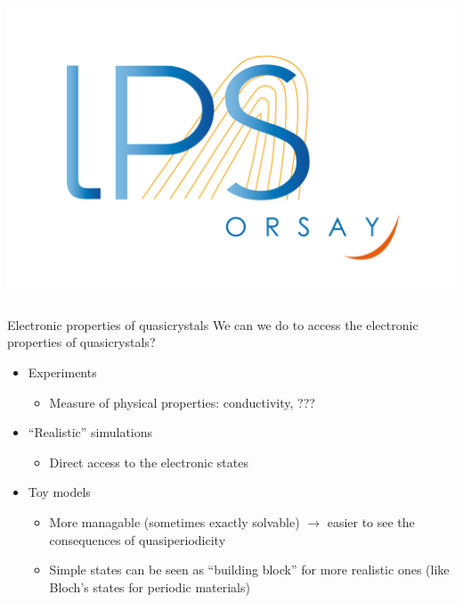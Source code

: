 \documentclass[xcolor=x11names,compress,professionalfonts]{beamer}
\renewcommand{\(}{\begin{columns}}
\renewcommand{\)}{\end{columns}}
\newcommand{\<}[1]{\begin{column}{#1}}
\renewcommand{\>}{\end{column}}
\begin{document}
\begin{frame}
\begin{columns}
\begin{column}{2cm}
~\\
~\\
\raggedleft
\includegraphics[scale=.15]{img/logo-lps.jpg}
\end{column}
\end{columns}
\end{frame}

\begin{frame}{Electronic properties of quasicrystals}
We can we do to access the electronic properties of quasicrystals?
\begin{itemize}
	\item Experiments
	\begin{itemize}
		\item Measure of physical properties: conductivity, ???
	\end{itemize}
	\item ``Realistic'' simulations
	\begin{itemize}
		\item Direct access to the electronic states 
	\end{itemize}
	\item Toy models
	\begin{itemize}
		\item More managable (sometimes exactly solvable) $\rightarrow$ easier to see the consequences of quasiperiodicity
		\item Simple states can be seen as ``building block'' for more realistic ones (like Bloch's states for periodic materials)
	\end{itemize}
\end{itemize}

\end{frame}
\end{document}

